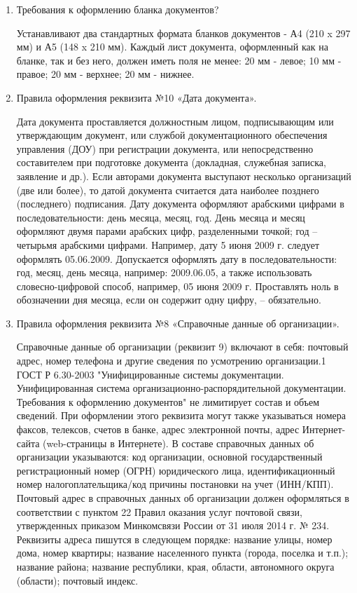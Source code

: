 \documentclass[a4paper,10pt]{article}
\theoremstyle{plain} %
\theoremstyle{definition} %
\theoremstyle{remark} %
\begin{document}
\begin{enumerate}
	\item Требования к оформлению бланка документов?
	
	Устанавливают два стандартных формата бланков документов - А4 (210 x 297 мм) и А5 (148 x 210 мм).
	Каждый лист документа, оформленный как на бланке, так и без него, должен иметь поля не менее:
	20 мм - левое;
	10 мм - правое;
	20 мм - верхнее;
	20 мм - нижнее.
	

	\item Правила оформления реквизита №10 «Дата документа».
	
	Дата документа проставляется должностным лицом, подписывающим или утверждающим документ, или службой документационного обеспечения управления (ДОУ) при регистрации документа, или непосредственно составителем при подготовке документа (докладная, служебная записка, заявление и др.). 
	Если авторами документа выступают несколько организаций (две или более), то датой документа считается дата наиболее позднего (последнего) подписания. 
	Дату документа оформляют арабскими цифрами в последовательности: день месяца, месяц, год. День месяца и месяц оформляют двумя парами арабских цифр, разделенными точкой; год – четырьмя арабскими цифрами.
	Например, дату 5 июня 2009 г. следует оформлять 05.06.2009.
	Допускается оформлять дату в последовательности: год, месяц, день месяца, например: 2009.06.05, а также использовать словесно-цифровой способ, например, 05 июня 2009 г. Проставлять ноль в обозначении дня месяца, если он содержит одну цифру, – обязательно.
	

	\item Правила оформления реквизита №8 «Справочные данные об организации».
	
	Справочные данные об организации (реквизит 9) включают в себя: почтовый адрес, номер телефона и другие сведения по усмотрению организации.1 ГОСТ Р 6.30-2003 "Унифицированные системы документации. Унифицированная система организационно-распорядительной документации. Требования к оформлению документов" не лимитирует состав и объем сведений. При оформлении этого реквизита могут также указываться номера факсов, телексов, счетов в банке, адрес электронной почты, адрес Интернет-сайта (web-страницы в Интернете).
	В составе справочных данных об организации указываются: код организации, основной государственный регистрационный номер (ОГРН) юридического лица, идентификационный номер налогоплательщика/код причины постановки на учет (ИНН/КПП).
	Почтовый адрес в справочных данных об организации должен оформляться в соответствии с пунктом 22 Правил оказания услуг почтовой связи, утвержденных приказом Минкомсвязи России от 31 июля 2014 г. № 234. Реквизиты адреса пишутся в следующем порядке:
	название улицы, номер дома, номер квартиры;
	название населенного пункта (города, поселка и т.п.);
	название района;
	название республики, края, области, автономного округа (области);
	почтовый индекс.
	


\end{enumerate}
\end{document}
